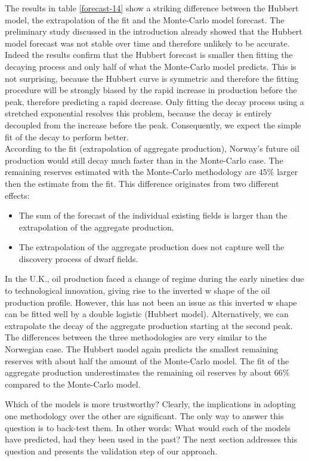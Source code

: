 \documentclass[review]{elsarticle}
\begin{document}
The results in table \ref{forecast-14} show a striking difference
between the Hubbert model, the extrapolation of the fit and the Monte-Carlo model forecast. The preliminary study discussed in the introduction already showed that the Hubbert model forecast was not stable over time and therefore unlikely to be accurate. Indeed the results confirm that the Hubbert forecast is smaller then fitting the decaying process and only half of what the Monte-Carlo model predicts. This is not surprising, because the Hubbert curve is symmetric and therefore the fitting procedure will be strongly biased by the rapid increase in production before the peak, therefore predicting a rapid decrease. Only fitting the decay process using a stretched exponential resolves this problem, because the decay is entirely decoupled from the increase before the peak. Consequently, we expect the simple fit of the decay to perform better.\\
According to the fit (extrapolation of aggregate production), Norway's future oil production would still decay much faster than in the Monte-Carlo case. The remaining reserves estimated with the Monte-Carlo methodology are $45\%$ larger
then the estimate from the fit. This difference originates from two
different effects:
\begin{itemize}
\item The sum of the forecast of the individual existing fields is larger
than the extrapolation of the aggregate production.
\item The extrapolation of the aggregate production does not capture well
the discovery process of dwarf fields.
\end{itemize}
In the U.K., oil production faced a change of regime during the early
nineties due to technological innovation, giving rise to the inverted
\textquotedbl{}w shape\textquotedbl{} of the oil production profile.
However, this has not been an issue as this inverted \textquotedbl{}w shape\textquotedbl{}
can be fitted well by a double logistic (Hubbert model). Alternatively, we can extrapolate the decay of the aggregate production starting at the second peak. The differences between the three methodologies are very similar to the Norwegian case. The Hubbert model again predicts the smallest remaining reserves with about half the amount of the Monte-Carlo model. The fit of the aggregate production underestimates the remaining oil reserves by about $66\%$ compared to the Monte-Carlo model.

Which of the models is more trustworthy? Clearly, the implications
in adopting one methodology over the other are significant. The only
way to answer this question is to back-test them. In other words:
\textquotedbl{}What would each of the models have predicted, had they
been used in the past?\textquotedbl{} The next section addresses
this question and presents the validation step of our approach.
\end{document}
